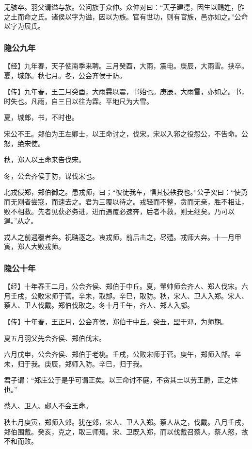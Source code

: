 \documentclass[]{article}
\begin{document}
无骇卒。羽父请谥与族。公问族于众仲。众仲对曰：``天子建德，因生以赐姓，胙之土而命之氏。诸侯以字为谥，因以为族。官有世功，则有官族，邑亦如之。''公命以字为展氏。

\hypertarget{header-n116}{%
\subsubsection{隐公九年}\label{header-n116}}

【经】九年春，天子使南季来聘。三月癸酉，大雨，震电。庚辰，大雨雪。挟卒。夏，城郎。秋七月。冬，公会齐侯于防。

【传】九年春，王三月癸酉，大雨霖以震，书始也。庚辰，大雨雪，亦如之。书，时失也。凡雨，自三日以往为霖。平地尺为大雪。

夏，城郎，书，不时也。

宋公不王。郑伯为王左卿士，以王命讨之，伐宋。宋以入郛之役怨公，不告命。公怒，绝宋使。

秋，郑人以王命来告伐宋。

冬，公会齐侯于防，谋伐宋也。

北戎侵郑，郑伯御之。患戎师，曰；``彼徒我车，惧其侵轶我也。''公子突曰：``使勇而无刚者尝寇，而速去之。君为三覆以待之。戎轻而不整，贪而无亲，胜不相让，败不相救。先者见获必务进，进而遇覆必速奔，后者不救，则无继矣。乃可以逞。''从之。

戎人之前遇覆者奔。祝聃逐之。衷戎师，前后击之，尽殪。戎师大奔。十一月甲寅，郑人大败戎师。

\hypertarget{header-n127}{%
\subsubsection{隐公十年}\label{header-n127}}

【经】十年春王二月，公会齐侯、郑伯于中丘。夏，翬帅师会齐人、郑人伐宋。六月壬戌，公败宋师于菅。辛未，取郜。辛巳，取防。秋，宋人、卫人入郑。宋人、蔡人、卫人伐戴。郑伯伐取之。冬十月壬午，齐人、郑人入郕。

【传】十年春，王正月，公会齐侯，郑伯于中丘。癸丑，盟于邓，为师期。

夏五月羽父先会齐侯、郑伯伐宋。

六月戊申，公会齐侯、郑伯于老桃。壬戌，公败宋师于菅。庚午，郑师入郜。辛未，归于我。庚辰，郑师入防。辛巳，归于我。

君子谓：``郑庄公于是乎可谓正矣。以王命讨不庭，不贪其土以劳王爵，正之体也。''

蔡人、卫人、郕人不会王命。

秋七月庚寅，郑师入郊。犹在郊，宋人、卫人入郑。蔡人从之，伐戴。八月壬戌，郑伯围戴。癸亥，克之，取三师焉。宋、卫既入郑，而以伐戴召蔡人，蔡人怒，故不和而败。
\end{document}
